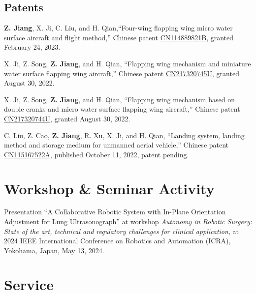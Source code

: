 \documentclass[11pt,letterpaper]{report}
\begin{document}
\subsection*{Patents}
\begin{tablist}		
	\item[2023]   \tab{}\textbf{Z. Jiang}, X. Ji, C. Liu, and H. Qian,``Four-wing flapping wing micro water surface aircraft and flight method,'' Chinese patent \href{https://patents.google.com/patent/CN114889821B/en?oq=CN114889821B}{CN114889821B}, granted February 24, 2023.
	
	\item[2022]   \tab{}X. Ji, Z. Song, \textbf{Z. Jiang}, and H. Qian, ``Flapping wing mechanism and miniature water surface flapping wing aircraft,'' Chinese patent \href{https://patents.google.com/patent/CN217320745U/en?oq=CN217320745U}{CN217320745U}, granted August 30, 2022.  
	
	\item[2022]   \tab{}X. Ji, Z. Song, \textbf{Z. Jiang}, and H. Qian, ``Flapping wing mechanism based on double cranks and micro water surface flapping wing aircraft,'' Chinese patent \href{https://patents.google.com/patent/CN217320744U/en?oq=CN217320744U}{CN217320744U}, granted August 30, 2022.  
	
	\item[2022]   \tab{}C. Liu, Z. Cao, \textbf{Z. Jiang}, R. Xu, X. Ji, and H. Qian, ``Landing system, landing method and storage medium for unmanned aerial vehicle,'' Chinese patent \href{https://patents.google.com/patent/CN115167522A/en?oq=CN115167522A}{CN115167522A}, published October 11, 2022, patent pending.
\end{tablist}

\section*{Workshop \& Seminar Activity}
\begin{tablist}
	\item[2024] \tab Presentation ``A Collaborative Robotic System with In-Plane Orientation Adjustment for Lung Ultrasonograph'' at workshop \textit{Autonomy in Robotic Surgery: State of the art, technical and regulatory challenges for clinical application}, at 2024 IEEE International Conference on Robotics and Automation (ICRA), Yokohama, Japan, May 13, 2024. 
\end{tablist}

\section*{Service}
\end{document}
